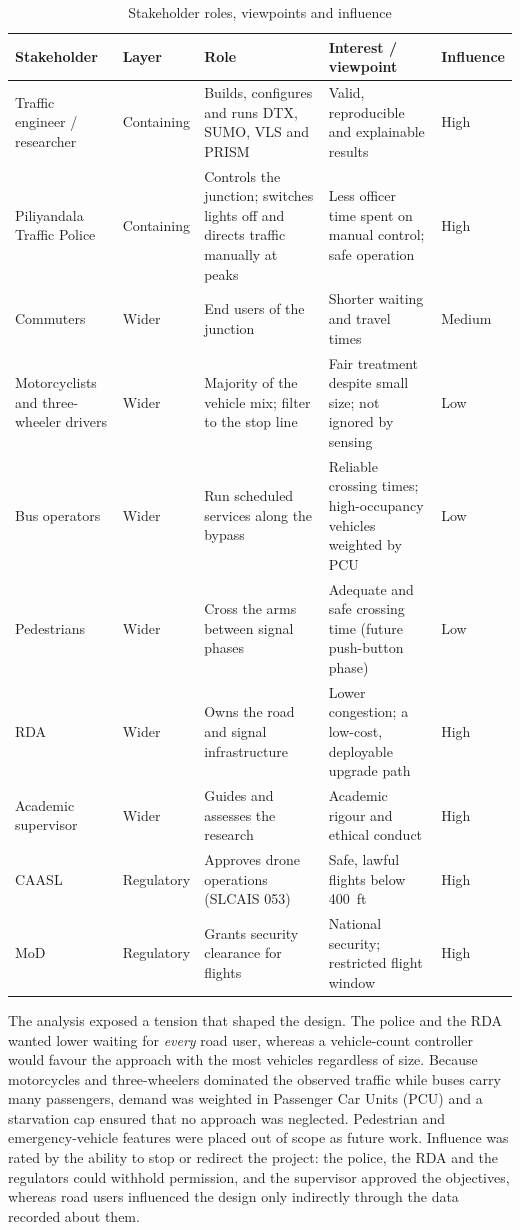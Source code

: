 \begin{table}[htbp]
\centering
\caption{Stakeholder roles, viewpoints and influence}
\label{tab:srs-stakeholders}
\small
\renewcommand{\arraystretch}{1.15}
\begin{tabularx}{\textwidth}{@{}>{\raggedright\arraybackslash}p{2.5cm}>{\raggedright\arraybackslash}p{1.75cm}>{\raggedright\arraybackslash}X>{\raggedright\arraybackslash}X>{\raggedright\arraybackslash}p{1.65cm}@{}}
\toprule
\textbf{Stakeholder} & \textbf{Layer} & \textbf{Role} & \textbf{Interest / viewpoint} & \textbf{Influence}\\
\midrule
Traffic engineer / researcher & Containing & Builds, configures and runs DTX, SUMO, VLS and PRISM & Valid, reproducible and explainable results & High\\
Piliyandala Traffic Police & Containing & Controls the junction; switches lights off and directs traffic manually at peaks & Less officer time spent on manual control; safe operation & High\\
Commuters & Wider & End users of the junction & Shorter waiting and travel times & Medium\\
Motorcyclists and three-wheeler drivers & Wider & Majority of the vehicle mix; filter to the stop line & Fair treatment despite small size; not ignored by sensing & Low\\
Bus operators & Wider & Run scheduled services along the bypass & Reliable crossing times; high-occupancy vehicles weighted by PCU & Low\\
Pedestrians & Wider & Cross the arms between signal phases & Adequate and safe crossing time (future push-button phase) & Low\\
RDA & Wider & Owns the road and signal infrastructure & Lower congestion; a low-cost, deployable upgrade path & High\\
Academic supervisor & Wider & Guides and assesses the research & Academic rigour and ethical conduct & High\\
CAASL & Regulatory & Approves drone operations (SLCAIS 053) & Safe, lawful flights below 400~ft & High\\
MoD & Regulatory & Grants security clearance for flights & National security; restricted flight window & High\\
\bottomrule
\end{tabularx}
\end{table}

The analysis exposed a tension that shaped the design. The police and the RDA wanted lower waiting for \emph{every} road user, whereas a vehicle-count controller would favour the approach with the most vehicles regardless of size. Because motorcycles and three-wheelers dominated the observed traffic while buses carry many passengers, demand was weighted in Passenger Car Units (PCU) and a starvation cap ensured that no approach was neglected. Pedestrian and emergency-vehicle features were placed out of scope as future work. Influence was rated by the ability to stop or redirect the project: the police, the RDA and the regulators could withhold permission, and the supervisor approved the objectives, whereas road users influenced the design only indirectly through the data recorded about them.

